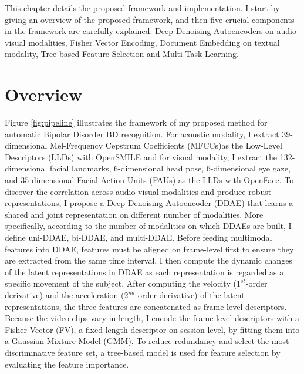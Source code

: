 


This chapter details the proposed framework and implementation. I start by giving an overview of the proposed framework, and then five crucial components in the framework are carefully explained: Deep Denoising Autoencoders on audio-visual modalities, Fisher Vector Encoding, Document Embedding on textual modality, Tree-based Feature Selection and Multi-Task Learning. 





\section{Overview}

Figure \ref{fig:pipeline} illustrates the framework of my proposed method for automatic Bipolar Disorder BD recognition. For acoustic modality, I extract 39-dimensional Mel-Frequency Cepstrum Coefficients (MFCCs)\footnotemark as the Low-Level Descriptors (LLDs) with OpenSMILE and for visual modality, I extract the 132-dimensional facial landmarks, 6-dimensional head pose, 6-dimensional eye gaze, and 35-dimensional Facial Action Units (FAUs) as the LLDs with OpenFace. To discover the correlation across audio-visual modalities and produce robust representations, I propose a Deep Denoising Autoencoder (DDAE) that learns a shared and joint representation on different number of modalities. More specifically, according to the number of modalities on which DDAEs are built, I define uni-DDAE, bi-DDAE, and multi-DDAE. Before feeding multimodal features into DDAE, features must be aligned on frame-level first to ensure they are extracted from the same time interval. I then compute the dynamic changes of the latent representations in DDAE as each representation is regarded as a specific movement of the subject. After computing the velocity ($1^{st}$-order derivative) and the acceleration ($2^{nd}$-order derivative) of the latent representations, the three features are concatenated as frame-level descriptors. Because the video clips vary in length, I encode the frame-level descriptors with a Fisher Vector (FV), a fixed-length descriptor on session-level, by fitting them into a Gaussian Mixture Model (GMM). To reduce redundancy and select the most discriminative feature set, a tree-based model is used for feature selection by evaluating the feature importance.


